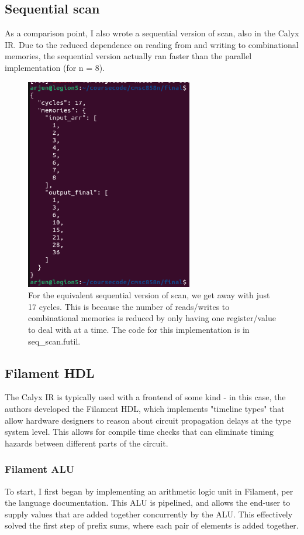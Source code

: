 \documentclass[12pt]{article}
\begin{document}
\subsection{Sequential scan}
As a comparison point, I also wrote a sequential version of scan, also in the Calyx IR. Due to the reduced dependence on
reading from and writing to combinational memories, the sequential version actually ran faster than the parallel implementation
(for n = 8).

\begin{figure}[H]
    \centering
    \includegraphics[height=25em]{images/seq_sums_scan.png}
    \caption{For the equivalent sequential version of scan, we get away with just 17 cycles. This is because the number of
    reads/writes to combinational memories is reduced by only having one register/value to deal with at a time. The code for this implementation
    is in seq\_scan.futil.}
\end{figure}

\subsection{Filament HDL}
The Calyx IR is typically used with a frontend of some kind - in this case, the authors developed the Filament HDL, which
implements "timeline types" that allow hardware designers to reason about circuit propagation delays at the type system level.
This allows for compile time checks that can eliminate timing hazards between different parts of the circuit.

\subsubsection{Filament ALU}
To start, I first began by implementing an arithmetic logic unit in Filament, per the language documentation. This ALU is pipelined,
and allows the end-user to supply values that are added together concurrently by the ALU. This effectively solved the first step of
prefix sums, where each pair of elements is added together.
\end{document}
